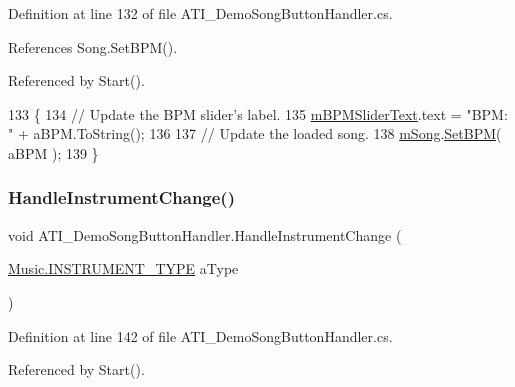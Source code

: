 Definition at line 132 of file A\+T\+I\+\_\+\+Demo\+Song\+Button\+Handler.\+cs.



References Song.\+Set\+B\+P\+M().



Referenced by Start().


\begin{DoxyCode}
133     \{
134         \textcolor{comment}{// Update the BPM slider's label.}
135         \hyperlink{class_a_t_i___demo_song_button_handler_af884aa63036769a78f92d86084156263}{mBPMSliderText}.text = \textcolor{stringliteral}{"BPM: "} + aBPM.ToString();
136 
137         \textcolor{comment}{// Update the loaded song.}
138         \hyperlink{class_a_t_i___demo_song_button_handler_aef782d481c6250a9062162c71298ed8f}{mSong}.\hyperlink{group___song_pub_func_gaa65bbba1af7192edff7e0f848029013b}{SetBPM}( aBPM );
139     \}
\end{DoxyCode}
\mbox{\label{class_a_t_i___demo_song_button_handler_a2801913e33a297ae1f5db91f851ddea6}} 
\subsubsection{\texorpdfstring{Handle\+Instrument\+Change()}{HandleInstrumentChange()}}
{\footnotesize\ttfamily void A\+T\+I\+\_\+\+Demo\+Song\+Button\+Handler.\+Handle\+Instrument\+Change (\begin{DoxyParamCaption}\item[{\hyperlink{group___music_enums_gabfce60192305965558a36e368ebd67c3}{Music.\+I\+N\+S\+T\+R\+U\+M\+E\+N\+T\+\_\+\+T\+Y\+PE}}]{a\+Type }\end{DoxyParamCaption})}



Definition at line 142 of file A\+T\+I\+\_\+\+Demo\+Song\+Button\+Handler.\+cs.



Referenced by Start().


